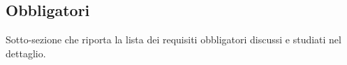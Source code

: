 \subsection{Obbligatori}

Sotto-sezione che riporta la lista dei requisiti obbligatori discussi e studiati nel dettaglio.
